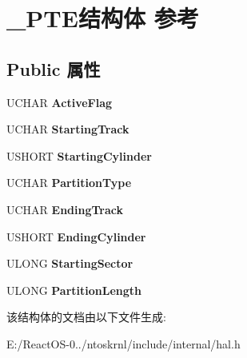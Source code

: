 \hypertarget{struct___p_t_e}{}\section{\+\_\+\+P\+T\+E结构体 参考}
\label{struct___p_t_e}
\subsection*{Public 属性}
\begin{DoxyCompactItemize}
\item 
\mbox{\label{struct___p_t_e_af8dc38c21b5d5cca348084e87eb55287}} 
U\+C\+H\+AR {\bfseries Active\+Flag}
\item 
\mbox{\label{struct___p_t_e_a98cc0ecbe8caad709905ac602031d854}} 
U\+C\+H\+AR {\bfseries Starting\+Track}
\item 
\mbox{\label{struct___p_t_e_ac2f9b0fdc72d6d0d30f9bea348f7a192}} 
U\+S\+H\+O\+RT {\bfseries Starting\+Cylinder}
\item 
\mbox{\label{struct___p_t_e_ac6a10c9ddc92ec7649c813d01e0cf638}} 
U\+C\+H\+AR {\bfseries Partition\+Type}
\item 
\mbox{\label{struct___p_t_e_a87deded5790c15d09641b04f803fbc7b}} 
U\+C\+H\+AR {\bfseries Ending\+Track}
\item 
\mbox{\label{struct___p_t_e_a7d0b23edf28ab5dddf07e8a6c9e2e47e}} 
U\+S\+H\+O\+RT {\bfseries Ending\+Cylinder}
\item 
\mbox{\label{struct___p_t_e_a9cb42c4aed44ae496a7bc5bf2949816c}} 
U\+L\+O\+NG {\bfseries Starting\+Sector}
\item 
\mbox{\label{struct___p_t_e_aa357d2ec3969d6284402fea8c7d06d32}} 
U\+L\+O\+NG {\bfseries Partition\+Length}
\end{DoxyCompactItemize}


该结构体的文档由以下文件生成\+:\begin{DoxyCompactItemize}
\item 
E\+:/\+React\+O\+S-\/0../ntoskrnl/include/internal/hal.\+h\end{DoxyCompactItemize}
